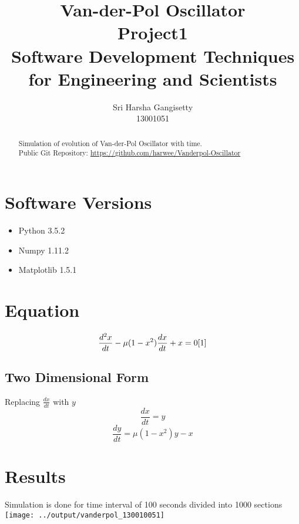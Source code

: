 \documentclass[a4paper]{article}
\title{Van-der-Pol Oscillator\\
			\large Project1 \\
			\large Software Development Techniques for Engineering and Scientists}
\author{Sri Harsha Gangisetty \\
					13001051}
\begin{document}
\maketitle

\begin{abstract}
Simulation of evolution of Van-der-Pol Oscillator with time. \\

Public Git Repository: \href{https://github.com/harwee/Vanderpol-Oscillator}{https://github.com/harwee/Vanderpol-Oscillator}

\end{abstract}

\section{Software Versions}

\begin{itemize}
\item Python 3.5.2
\item Numpy 1.11.2
\item Matplotlib 1.5.1
\end{itemize}
\section{Equation}

\begin{equation}
\frac{d^2x}{dt}-\mu (1-x^2) \frac{dx}{dt} + x = 0 \cite{1}
\end{equation}
\subsection{Two Dimensional Form}

	Replacing $ \frac{dx}{dt} $ with $ y $ \\
	\begin{equation}
	\frac{dx}{dt} = y
	\end{equation}
    \begin{equation}
	\frac{dy}{dt} = \mu (1-x^2)y -x
	\end{equation}
\newpage
\section{Results}
	Simulation is done for time interval of 100 seconds divided into 1000 sections
\centering
\texttt{[image: ../output/vanderpol\_130010051]}
\end{document}
